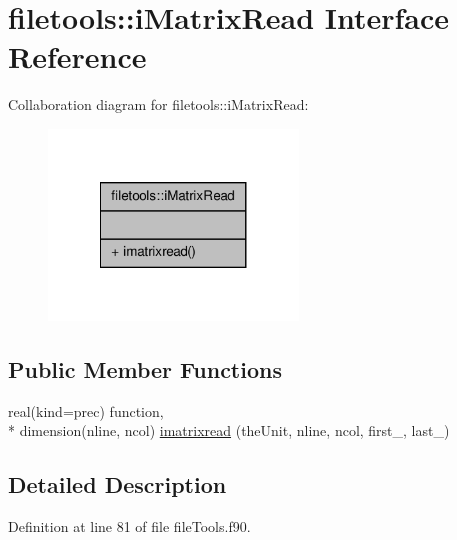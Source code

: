 \hypertarget{interfacefiletools_1_1i_matrix_read}{\section{filetools\-:\-:i\-Matrix\-Read Interface Reference}
\label{interfacefiletools_1_1i_matrix_read}
}


Collaboration diagram for filetools\-:\-:i\-Matrix\-Read\-:\nopagebreak
\begin{figure}[H]
\begin{center}
\leavevmode
\includegraphics[width=188pt]{interfacefiletools_1_1i_matrix_read__coll__graph}
\end{center}
\end{figure}
\subsection*{Public Member Functions}
\begin{DoxyCompactItemize}
\item 
real(kind=prec) function, \\*
dimension(nline, ncol) \hyperlink{interfacefiletools_1_1i_matrix_read_afa8b378d4dfdc6516ef2c90a9d9d89ca}{imatrixread} (the\-Unit, nline, ncol, first\-\_\-, last\-\_\-)
\end{DoxyCompactItemize}


\subsection{Detailed Description}


Definition at line 81 of file file\-Tools.\-f90.



